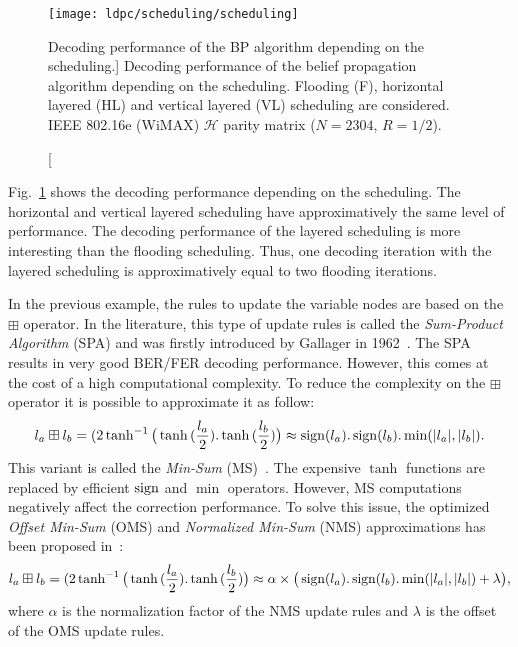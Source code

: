 \begin{figure}[htp]
  \centering
  \texttt{[image: ldpc/scheduling/scheduling]}
  \caption
    [Decoding performance of the BP algorithm depending on the scheduling.]
    {Decoding performance of the belief propagation algorithm depending on the
     scheduling. Flooding (F), horizontal layered (HL) and vertical layered (VL)
     scheduling are considered. IEEE 802.16e (WiMAX) $\mathcal{H}$ parity matrix
     ($N=2304$, $R=1/2$).}
  \label{fig:alg_ldpc_scheduling}
\end{figure}

Fig.~\ref{fig:alg_ldpc_scheduling} shows the decoding performance depending on
the scheduling. The horizontal and vertical layered scheduling have
approximatively the same level of performance. The decoding performance of the
layered scheduling is more interesting than the flooding scheduling. Thus, one
decoding iteration with the layered scheduling is approximatively equal to two
flooding iterations.

In the previous example, the rules to update the variable nodes are based on the
$\boxplus$ operator. In the literature, this type of update rules is called the
\emph{Sum-Product Algorithm} (SPA) and was firstly introduced by
Gallager in 1962~\cite{Gallager1962}. The SPA results in very good BER/FER
decoding performance. However, this comes at the cost of a high computational
complexity. To reduce the complexity on the $\boxplus$ operator it is possible
to approximate it as follow:
\begin{equation}
l_a \boxplus l_b = (2\tanh^{-1}{\big(\tanh{(\frac{l_a}{2}).\tanh{(\frac{l_b}{2})}}\big)} \approx \operatorname*{sign}(l_a).\operatorname*{sign}(l_b).\min(|l_a|, |l_b|).
\end{equation}
This variant is called the \emph{Min-Sum} (MS)~\cite{Fossorier1999}.
The expensive $\tanh$ functions are replaced by efficient $\operatorname*{sign}$ and $\min$
operators. However, MS computations negatively affect the correction
performance. To solve this issue, the optimized \emph{Offset Min-Sum} (OMS) and
\emph{Normalized Min-Sum} (NMS) approximations has been proposed
in~\cite{Chen2002}:
\begin{equation}
l_a \boxplus l_b = (2\tanh^{-1}{\big(\tanh{(\frac{l_a}{2}).\tanh{(\frac{l_b}{2})}}\big)} \approx \alpha \times \big( \operatorname*{sign}(l_a).\operatorname*{sign}(l_b).\min(|l_a|, |l_b|) + \lambda \big),
\end{equation}
where $\alpha$ is the normalization factor of the NMS update rules and $\lambda$
is the offset of the OMS update rules.


